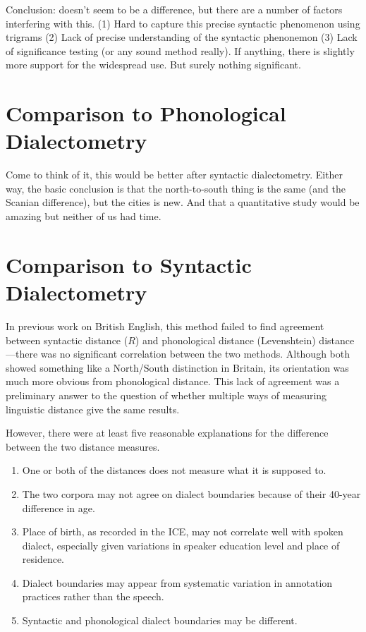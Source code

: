Conclusion: doesn't seem to be a difference, but there are a number of
factors interfering with this. (1) Hard to capture this precise
syntactic phenomenon using trigrams (2) Lack of
precise understanding of the syntactic phenonemon (3) Lack of
significance testing (or any sound method really).
If anything, there is slightly more support for the widespread
use. But surely nothing significant.

\section{Comparison to Phonological Dialectometry}

Come to think of it, this would be better after syntactic
dialectometry. Either way, the basic conclusion is that the
north-to-south thing is the same (and the Scanian difference), but the
cities is new. And that a quantitative study would be amazing but
neither of us had time.

\section{Comparison to Syntactic Dialectometry}

In previous work on British English, this method failed to find
agreement between syntactic distance ($R$) and phonological distance
(Levenshtein) distance---there was no
significant correlation between the two methods. Although both showed
something like a North/South distinction in Britain, its orientation was much more
obvious from phonological distance. This lack of agreement was a
preliminary answer to the question of whether multiple
ways of measuring linguistic distance give the same results.

However, there were at least five reasonable explanations for the difference
between the two distance measures.

\begin{enumerate}
\item One or both of the distances does not measure what it is supposed to.
\item The two corpora may not agree on dialect boundaries because of
  their 40-year difference in age.
\item Place of birth, as recorded in the ICE, may not correlate well
  with spoken dialect, especially given variations in speaker
  education level and place of residence.
\item Dialect boundaries may appear from systematic variation in
  annotation practices rather than the speech.
\item Syntactic and phonological dialect boundaries may be different.
\end{enumerate}

